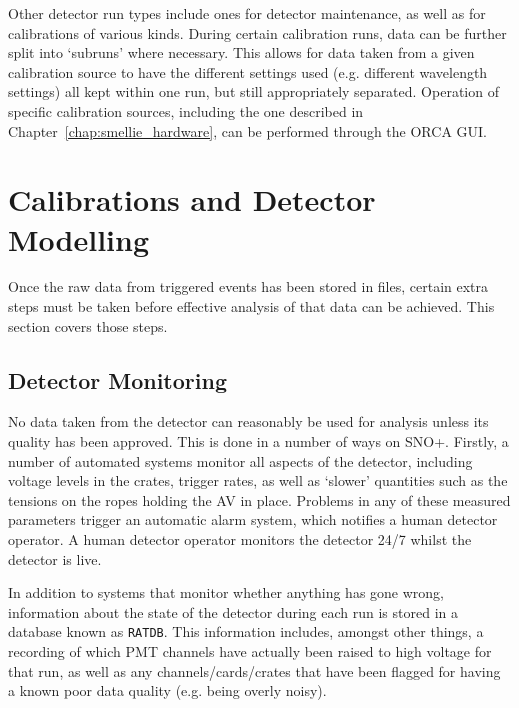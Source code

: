 Other detector run types include ones for detector maintenance, as well as for calibrations of various kinds. During certain calibration runs, data can be further split into `subruns' where necessary. This allows for data taken from a given calibration source to have the different settings used (e.g. different wavelength settings) all kept within one run, but still appropriately separated. Operation of specific calibration sources, including the one described in Chapter~\ref{chap:smellie_hardware}, can be performed through the ORCA GUI.


\section{Calibrations and Detector Modelling}\label{sec:calibs_modelling}
Once the raw data from triggered events has been stored in files, certain extra steps must be taken before effective analysis of that data can be achieved. This section covers those steps.

\subsection{Detector Monitoring}
No data taken from the detector can reasonably be used for analysis unless its quality has been approved. This is done in a number of ways on SNO+. Firstly, a number of automated systems monitor all aspects of the detector, including voltage levels in the crates, trigger rates, as well as `slower' quantities such as the tensions on the ropes holding the AV in place. Problems in any of these measured parameters trigger an automatic alarm system, which notifies a human detector operator. A human detector operator monitors the detector 24/7 whilst the detector is live.

In addition to systems that monitor whether anything has gone wrong, information about the state of the detector during each run is stored in a database known as \texttt{RATDB}. This information includes, amongst other things, a recording of which PMT channels have actually been raised to high voltage for that run, as well as any channels/cards/crates that have been flagged for having a known poor data quality (e.g. being overly noisy).


